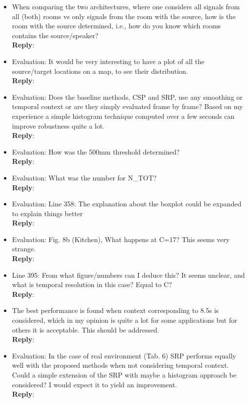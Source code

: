 \documentclass[11pt, technote, letterpaper, oneside, onecolumn]{IEEEtran}
\begin{document}
\begin{itemize}
\item When comparing the two architectures, where one considers all signals from all (both) rooms vs only signals from the room with the source, how is the room with the source determined, i.e., how do you know which rooms contains the source/speaker?\\
\textbf{Reply}:

\item Evaluation: It would be very interesting to have a plot of all the source/target locations on a map, to see their distribution.\\
\textbf{Reply}:

\item Evaluation: Does the baseline methods, CSP and SRP, use any smoothing or temporal context or are they simply evaluated frame by frame? Based on my experience a simple histogram technique computed over a few seconds can improve robustness quite a lot.\\
\textbf{Reply}:

\item Evaluation: How was the 500mm threshold determined?\\
\textbf{Reply}:

\item Evaluation: What was the number for N\_TOT?\\
\textbf{Reply}:

\item Evaluation: Line 358: The explanation about the boxplot could be expanded to explain things better\\
\textbf{Reply}:

\item Evaluation: Fig. 8b (Kitchen), What happens at C=17? This seems very strange.\\
\textbf{Reply}:

\item Line 395: From what figure/numbers can I deduce this? It seems unclear, and what is temporal resolution in this case? Equal to C?\\
\textbf{Reply}:

\item The best performance is found when context corresponding to 8.5s is considered, which in my opinion is quite a lot for some applications but for others it is acceptable. This should be addressed.\\
\textbf{Reply}:

\item Evaluation: In the case of real environment (Tab. 6) SRP performs equally well with the proposed methods when not considering temporal context. Could a simple extension of the SRP with maybe a histogram approach be considered? I would expect it to yield an improvement.\\
\textbf{Reply}:


\end{itemize}
\end{document}
